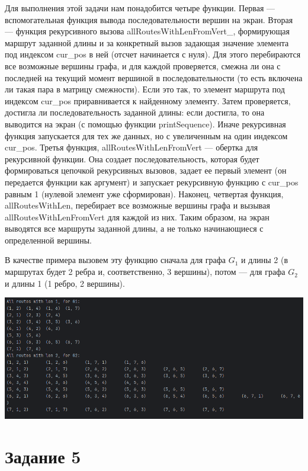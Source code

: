 \documentclass[12pt]{article}
\begin{document}
	Для выполнения этой задачи нам понадобится четыре функции. Первая --- вспомогательная функция вывода последовательности вершин на экран. Вторая --- функция рекурсивного вызова allRoutesWithLenFromVert\_, формирующая маршрут заданной длины и за конкретный вызов задающая значение элемента под индексом cur\_pos в ней (отсчет начинается с нуля). Для этого перебираются все возможные вершины графа, и для каждой проверяется, смежна ли она с последней на текущий момент вершиной в последовательности (то есть включена ли такая пара в матрицу смежности). Если это так, то элемент маршрута под индексом cur\_pos приравнивается к найденному элементу. Затем проверяется, достигла ли последовательность заданной длины: если достигла, то она выводится на экран (с помощью функции printSequence). Иначе рекурсивная функция запускается для тех же данных, но с увеличенным на один индексом cur\_pos. Третья функция, allRoutesWithLenFromVert --- обертка для рекурсивной функции. Она создает последовательность, которая будет формироваться цепочкой рекурсивных вызовов, задает ее первый элемент (он передается функции как аргумент) и запускает рекурсивную функцию с cur\_pos равным 1 (нулевой элемент уже сформирован). Наконец, четвертая функция, allRoutesWithLen, перебирает все возможные вершины графа и вызывая allRoutesWithLenFromVert для каждой из них. Таким образом, на экран выводятся все маршруты заданной длины, а не только начинающиеся с определенной вершины.
	
	В качестве примера вызовем эту функцию сначала для графа $G_1$ и длины 2 (в маршрутах будет 2 ребра и, соответственно, 3 вершины), потом --- для графа $G_2$ и длины 1 (1 ребро, 2 вершины).
	
	
	{\centering
	\includegraphics[width=150mm]{images/ex4.png} 
	}
	
	\section{Задание 5}
	\label{task5}
	
\end{document}
